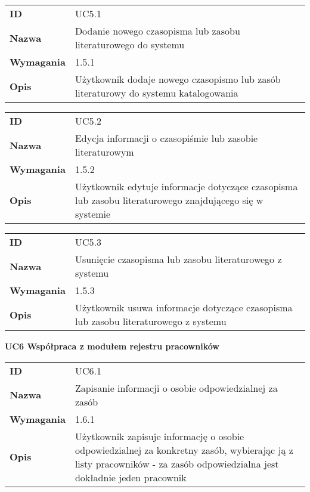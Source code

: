 \begin{tabular}{p{}p{}}
\hfill {\bf ID} & UC5.1 \\
\hfill {\bf Nazwa} & Dodanie nowego czasopisma lub zasobu literaturowego do systemu \\
\hfill {\bf Wymagania} & 1.5.1 \\
\hfill {\bf Opis} & Użytkownik dodaje nowego czasopismo lub zasób literaturowy do systemu katalogowania \\
\end{tabular}

\vspace{.05\textheight}

\begin{tabular}{p{}p{}}
\hfill {\bf ID} & UC5.2 \\
\hfill {\bf Nazwa} & Edycja informacji o czasopiśmie lub zasobie literaturowym  \\
\hfill {\bf Wymagania} & 1.5.2 \\
\hfill {\bf Opis} &  Użytkownik edytuje informacje dotyczące czasopisma lub zasobu literaturowego znajdującego się w systemie \\
\end{tabular}

\vspace{.05\textheight}

\begin{tabular}{p{}p{}}
\hfill {\bf ID} & UC5.3 \\
\hfill {\bf Nazwa} & Usunięcie czasopisma lub zasobu literaturowego z systemu \\
\hfill {\bf Wymagania} & 1.5.3 \\
\hfill {\bf Opis} & Użytkownik usuwa informacje dotyczące czasopisma lub zasobu literaturowego z systemu \\
\end{tabular}

\vspace{.03\textheight}
\begin{center}
  {\Large\bf UC6 Współpraca z modułem rejestru pracowników}
\end{center}
\vspace{.02\textheight}

\begin{tabular}{p{}p{}}
\hfill {\bf ID} & UC6.1 \\
\hfill {\bf Nazwa} &  Zapisanie informacji o osobie odpowiedzialnej za zasób \\
\hfill {\bf Wymagania} & 1.6.1 \\
\hfill {\bf Opis} & Użytkownik zapisuje informację o osobie odpowiedzialnej za konkretny zasób, wybierając ją z listy pracowników - za zasób odpowiedzialna jest dokładnie jeden pracownik \\
\end{tabular}

